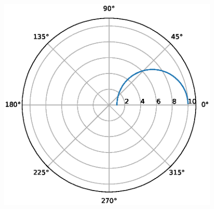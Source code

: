 \begin{enumerate}[label=\thesection.\arabic*.,ref=\thesection.\theenumi]
      \begin{figure}[!h]
      \centering
      \includegraphics[width=\columnwidth]{./figs/ee18btech11051.eps}
      \caption{}
      \label{fig:ee18btech11051_fig2}
      \end{figure}



\end{enumerate}
